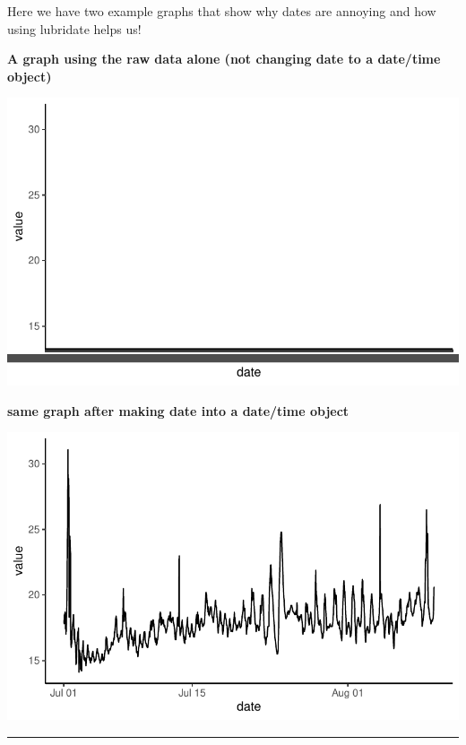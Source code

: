 \documentclass[
  letterpaper,
  DIV=11,
  numbers=noendperiod]{scrartcl}
\begin{document}
Here we have two example graphs that show why dates are annoying and how
using lubridate helps us!

\textbf{A graph using the raw data alone (not changing date to a
date/time object)}

\includegraphics{datetime_files/figure-pdf/unnamed-chunk-4-1.pdf}

\textbf{same graph after making date into a date/time object}

\includegraphics{datetime_files/figure-pdf/unnamed-chunk-5-1.pdf}

\begin{center}\rule{0.5\linewidth}{0.5pt}\end{center}
\end{document}
